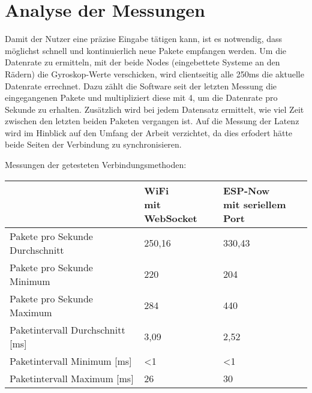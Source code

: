\section{Analyse der Messungen}
Damit der Nutzer eine präzise Eingabe tätigen kann, ist es notwendig, dass möglichst schnell und kontinuierlich neue Pakete empfangen werden.
Um die Datenrate zu ermitteln, mit der beide Nodes (eingebettete Systeme an den Rädern) die Gyroskop-Werte verschicken, wird clientseitig alle 250ms die aktuelle Datenrate errechnet.
Dazu zählt die Software seit der letzten Messung die eingegangenen Pakete und multipliziert diese mit 4, um die Datenrate pro Sekunde zu erhalten.
Zusätzlich wird bei jedem Datensatz ermittelt, wie viel Zeit zwischen den letzten beiden Paketen vergangen ist.
Auf die Messung der Latenz wird im Hinblick auf den Umfang der Arbeit verzichtet, da dies erfodert hätte beide Seiten der Verbindung zu synchronisieren.


Messungen der getesteten Verbindungsmethoden:
\begin{table}[h]
    \centering
    \begin{tabular}{|l|l|l|}
        \hline
        ~                                & \parbox[c][1cm]{2.4cm}{WiFi          \\mit WebSocket} & \parbox[c][1cm]{2.8cm}{ESP-Now\\mit seriellem Port} \\ \hline
        Pakete pro Sekunde Durchschnitt  & 250,16                      & 330,43 \\ \hline
        Pakete pro Sekunde Minimum       & 220                         & 204    \\ \hline
        Pakete pro Sekunde Maximum       & 284                         & 440    \\ \hline
        Paketintervall Durchschnitt [ms] & 3,09                        & 2,52   \\ \hline
        Paketintervall Minimum [ms]      & <1                          & <1     \\ \hline
        Paketintervall Maximum [ms]      & 26                          & 30     \\ \hline
    \end{tabular}
\end{table}

